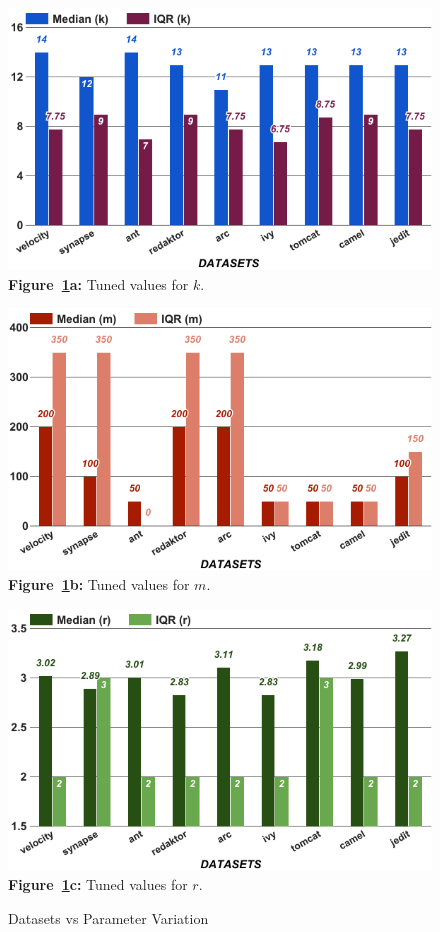\begin{figure}[!t]
    \centering
    \begin{minipage}{.33\textwidth}
    \centering
        \includegraphics[width=.95\linewidth]{./fig/k.png}
        {\bf Figure~\ref{fig:para}a:} Tuned values for $k$.
    \end{minipage}%
    \begin{minipage}{.33\textwidth}
    \centering
        \includegraphics[width=.95\linewidth]{./fig/m.png}
        {\bf Figure~\ref{fig:para}b:} Tuned values for $m$.
    \end{minipage}
    \begin{minipage}{.33\textwidth}
    \centering
        \includegraphics[width=.95\linewidth]{./fig/r.png}
        {\bf Figure~\ref{fig:para}c:} Tuned values for $r$.
    \end{minipage}
    \caption{Datasets vs Parameter Variation}
    \label{fig:para}
\end{figure}

